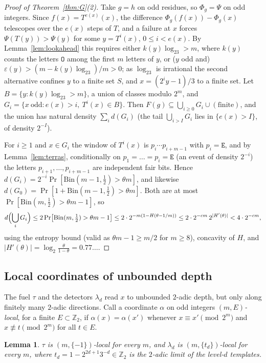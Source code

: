 \documentclass[11pt]{article}
\newtheorem{lemma}[theorem]{Lemma}
\theoremstyle{definition}
\theoremstyle{remark}
\newcommand{\Z}{\mathbb{Z}}
\begin{document}
\begin{proof}[Proof of Theorem~\ref{thm:G}(2)]
Take $g=h$ on odd residues, so $\Phi_g=\Psi$ on odd integers. Since
$f(x)=T^{e(x)}(x)$, the difference $\Phi_g(f(x))-\Phi_g(x)$ telescopes
over the $e(x)$ steps of $T$, and a failure at $x$ forces
$\Psi(T(y))>\Psi(y)$ for some $y=T^{i}(x)$, $0\le i<e(x)$. By
Lemma~\ref{lem:lookahead} this requires either $k(y)\log_23>m$, where
$k(y)$ counts the letters $\mathtt O$ among the first $m$ letters of $y$,
or ($y$ odd and) $\varepsilon(y)>(m-k(y)\log_23)/m>0$; as $\log_23$ is
irrational the second alternative confines $y$ to a finite set $S$, and
$x=(2^{i}y-1)/3$ to a finite set. Let $B=\{y:k(y)\log_23>m\}$, a union of
classes modulo $2^{m}$, and $G_i=\{x\ \text{odd}:e(x)>i,\ T^{i}(x)\in B\}$.
Then $F(g)\subseteq\bigcup_{i\ge0}G_i\cup(\text{finite})$, and the
union has natural density $\sum_i d(G_i)$ (the tail $\bigcup_{i>I}G_i$
lies in $\{e(x)>I\}$, of density $2^{-I}$).

For $i\ge1$ and $x\in G_i$ the window of $T^{i}(x)$ is
$p_i\cdots p_{i+m-1}$ with $p_i=\mathtt E$, and by
Lemma~\ref{lem:terras}, conditionally on $p_1=\dots=p_i=\mathtt E$ (an
event of density $2^{-i}$) the letters $p_{i+1},\dots,p_{i+m-1}$ are
independent fair bits. Hence $d(G_i)=2^{-i}\Pr[\mathrm{Bin}(m-1,\tfrac12)>\theta m]$,
and likewise $d(G_0)=\Pr[1+\mathrm{Bin}(m-1,\tfrac12)>\theta m]$. Both are
at most $\Pr[\mathrm{Bin}(m,\tfrac12)>\theta m-1]$, so
\[
d\Bigl(\bigcup_iG_i\Bigr)\le2\Pr\bigl[\mathrm{Bin}(m,\tfrac12)>\theta m-1\bigr]
\le2\cdot2^{-m(1-H(\theta-1/m))}
\le2\cdot2^{-cm}\,2^{|H'(\theta)|}<4\cdot2^{-cm},
\]
using the entropy bound (valid as $\theta m-1\ge m/2$ for $m\ge8$),
concavity of $H$, and $|H'(\theta)|=\log_2\frac{\theta}{1-\theta}=0.77\ldots$.
\end{proof}

\subsection*{Local coordinates of unbounded depth}

The fuel $\tau$ and the detectors $\lambda_d$ read $x$ to unbounded
$2$-adic depth, but only along finitely many $2$-adic directions. Call a
coordinate $\alpha$ on odd integers \emph{$(m,E)$-local}, for a finite
$E\subset\Z_2$, if $\alpha(x)=\alpha(x')$ whenever $x\equiv x'\pmod{2^{m}}$
and $x\not\equiv t\pmod{2^{m}}$ for all $t\in E$.

\begin{lemma}\label{lem:local}
$\tau$ is $(m,\{-1\})$-local for every $m$, and $\lambda_d$ is
$(m,\{t_d\})$-local for every $m$, where $t_d=1-2^{2d+1}3^{-d}\in\Z_2$ is
the $2$-adic limit of the level-$d$ templates.
\end{lemma}
\end{document}
